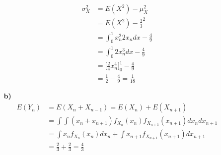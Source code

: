 \documentclass[a4paper,11pt]{article}
\begin{document}
\begin{enumerate}
\begin{enumerate}
			\begin{align*}
				\sigma_X^2 &= E(X^2) - \mu_X^2 \\
						   &= E(X^2) - \frac{2}{3}^2 \\
						   &= \int_0^1 x_n^2 2x_n dx - \frac{4}{9} \\
						   &= \int_0^1 2x_n^3 dx - \frac{4}{9} \\
						   &= \bigg[ \frac{2}{4} x_n^4 \bigg]_0^1 - \frac{4}{9} \\
						   &= \frac{1}{2} - \frac{4}{9} = \frac{1}{18}
			\end{align*}

			\item[\textbf{b)}]
			\begin{align*}
				E(Y_n) &= E(X_n + X_{n - 1}) = E(X_n) + E(X_{n + 1}) \\
					   &= \int\int (x_n + x_{n + 1}) f_{X_n}(x_n) f_{X_{n + 1}}(x_{n + 1}) dx_n dx_{n + 1} \\
					   &= \int x_n f_{X_n}(x_n) dx_n + \int x_{n + 1} f_{X_{n + 1}}(x_{n + 1}) dx_{n + 1} \\
					   &= \frac{2}{3} + \frac{2}{3} = \frac{4}{3}
			\end{align*}
		\end{enumerate}
	\end{enumerate}
\end{document}
